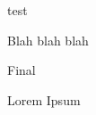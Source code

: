 \documentclass{my_homework}
\begin{document}
\maketitle



\problem[re][5]
test

\begin{Problem}
Blah blah blah
\end{Problem}

\problem
Final

\pagebreak

Lorem Ipsum
\end{document}
